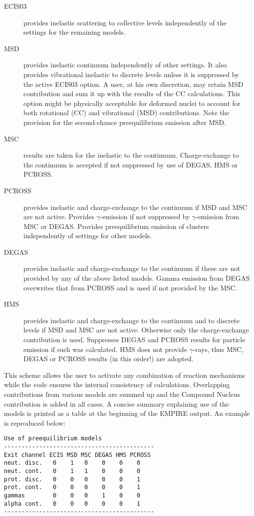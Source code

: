 \documentclass[twocolumn,amsmath,amssymb,10pt,groupedaddress,a4paper]{revtex4}
\begin{document}
\begin{description}
\item [ECIS03] provides inelastic scattering to collective
levels independently of the settings for the remaining models.
\item [MSD] provides inelastic continuum independently of other
settings. It also provides vibrational inelastic to discrete levels unless
it is suppressed by the active ECIS03 option.
A user, at his own discretion, may retain MSD contribution and sum it
up with the results of the CC calculations. This option might be physically
acceptable for deformed nuclei to account for both rotational (CC) and
vibrational (MSD) contributions. Note the provision for the second-chance preequilibrium
emission after MSD.
\item [MSC] results are taken for the inelastic to the continuum.
Charge-exchange to the continuum is accepted if not suppressed by
use of DEGAS, HMS or PCROSS.
\item [PCROSS] provides inelastic and charge-exchange to
the continuum if MSD and MSC are not active. Provides $\gamma$-emission if not suppressed by $\gamma$-emission
from MSC or DEGAS. Provides preequilibrium emission of clusters independently
of settings for other models.
\item [DEGAS] provides inelastic and charge-exchange to  the
continuum if these are not provided by any of the above listed
models. Gamma emission from DEGAS overwrites that from PCROSS and
is used if not provided by the MSC.
\item [HMS] provides inelastic and charge-exchange to the continuum
and to discrete levels if MSD and MSC are
not active. Otherwise only the charge-exchange contribution is used.
Suppresses DEGAS and PCROSS results for particle emission if such
was calculated. HMS does not provide $\gamma$-rays, thus
MSC, DEGAS or PCROSS results (in this order!) are adopted.
\end{description}
This scheme allows the user to activate any combination of reaction
mechanisms while the code ensures the internal consistency of calculations.
Overlapping contributions from various models are summed up and the
Compound Nucleus contribution is added in all cases. A concise summary
explaining use of the models is printed as a table at the beginning
of the EMPIRE output. An example is reproduced below:

\begin{verbatim}
Use of preequilibrium models
-------------------------------------------
Exit channel ECIS MSD MSC DEGAS HMS PCROSS
neut. disc.   0    1   0    0    0    0
neut. cont.   0    1   1    0    0    0
prot. disc.   0    0   0    0    0    1
prot. cont.   0    0   0    0    0    1
gammas        0    0   0    1    0    0
alpha cont.   0    0   0    0    0    1
-------------------------------------------
\end{verbatim}
\end{document}

